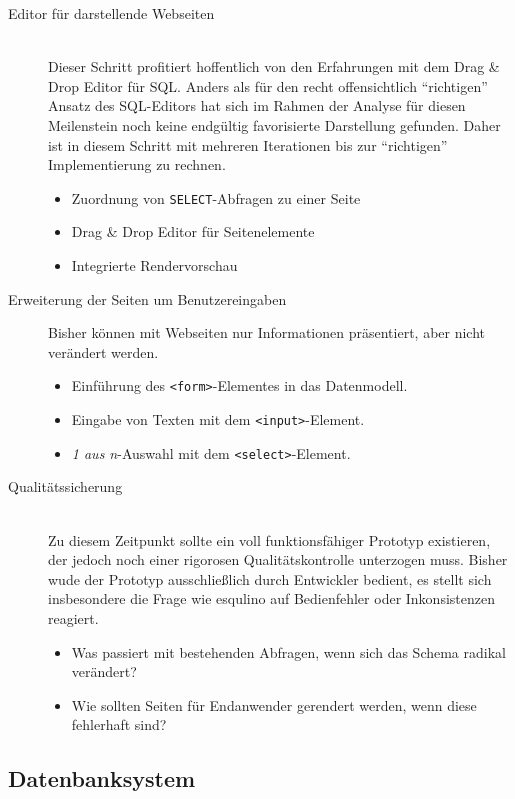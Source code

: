 \begin{description}
\item [Editor für darstellende Webseiten] \hfill \\
  Dieser Schritt profitiert hoffentlich von den Erfahrungen mit dem Drag \& Drop Editor für SQL. Anders als für den recht offensichtlich "`richtigen"' Ansatz des SQL-Editors hat sich im Rahmen der Analyse für diesen Meilenstein noch keine endgültig favorisierte Darstellung gefunden. Daher ist in diesem Schritt mit mehreren Iterationen bis zur "`richtigen"' Implementierung zu rechnen.
  \begin{itemize}
  \item Zuordnung von \texttt{SELECT}-Abfragen zu einer Seite
  \item Drag \& Drop Editor für Seitenelemente
  \item Integrierte Rendervorschau
  \end{itemize}
  
\item[Erweiterung der Seiten um Benutzereingaben]
  Bisher können mit Webseiten nur Informationen präsentiert, aber nicht verändert werden.
  \begin{itemize}
  \item Einführung des \texttt{<form>}-Elementes in das Datenmodell.
  \item Eingabe von Texten mit dem \texttt{<input>}-Element.
  \item \textit{1 aus n}-Auswahl mit dem \texttt{<select>}-Element.
  \end{itemize}
  
\item [Qualitätssicherung] \hfill \\
  Zu diesem Zeitpunkt sollte ein voll funktionsfähiger Prototyp existieren, der jedoch noch einer rigorosen Qualitätskontrolle unterzogen muss. Bisher wude der Prototyp ausschließlich durch Entwickler bedient, es stellt sich insbesondere die Frage wie esqulino auf Bedienfehler oder Inkonsistenzen reagiert.
  \begin{itemize}
  \item Was passiert mit bestehenden Abfragen, wenn sich das Schema radikal verändert?
  \item Wie sollten Seiten für Endanwender gerendert werden, wenn diese fehlerhaft sind?
  \end{itemize}
\end{description}

\subsection{Datenbanksystem}
\label{sec:implementation-database-system}

